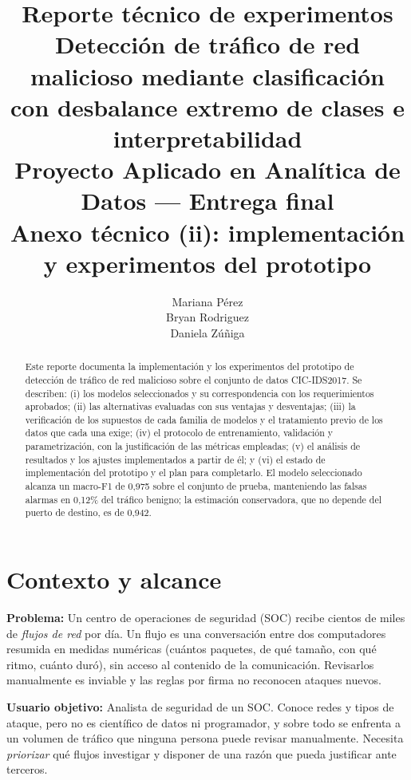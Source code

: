 \documentclass[11pt,a4paper]{article}
\title{\vspace{-1.2cm}\textbf{Reporte técnico de experimentos}\\[0.25cm]
\large Detección de tráfico de red malicioso mediante clasificación\\
\large con desbalance extremo de clases e interpretabilidad\\
\large \vspace{0.3cm} Proyecto Aplicado en Analítica de Datos --- Entrega final\\
\normalsize Anexo técnico (ii): implementación y experimentos del prototipo}
\author{Mariana Pérez\\Bryan Rodriguez\\Daniela Zúñiga}
\begin{document}
\maketitle
\thispagestyle{empty}

\begin{abstract}
\noindent
Este reporte documenta la implementación y los experimentos del prototipo de
detección de tráfico de red malicioso sobre el conjunto de datos CIC-IDS2017.
Se describen: (i) los modelos seleccionados y su correspondencia con los
requerimientos aprobados; (ii) las alternativas evaluadas con sus ventajas y
desventajas; (iii) la verificación de los supuestos de cada familia de
modelos y el tratamiento previo de los datos que cada una exige; (iv) el
protocolo de entrenamiento, validación y parametrización, con la
justificación de las métricas empleadas; (v) el análisis de resultados y los
ajustes implementados a partir de él; y (vi) el estado de implementación del
prototipo y el plan para completarlo. El modelo seleccionado alcanza un
macro-F1 de 0,975 sobre el conjunto de prueba, manteniendo las falsas alarmas
en 0,12\% del tráfico benigno; la estimación conservadora, que no depende del
puerto de destino, es de 0,942.
\end{abstract}

\vspace{0.3cm}

\section{Contexto y alcance}

\textbf{Problema:} Un centro de operaciones de seguridad (SOC) recibe cientos
de miles de \emph{flujos de red} por día. Un flujo es una conversación entre
dos computadores resumida en medidas numéricas (cuántos paquetes, de qué
tamaño, con qué ritmo, cuánto duró), sin acceso al contenido de la
comunicación. Revisarlos manualmente es inviable y las reglas por firma no
reconocen ataques nuevos.

\textbf{Usuario objetivo:} Analista de seguridad de un SOC. Conoce redes y
tipos de ataque, pero no es científico de datos ni programador, y sobre todo
se enfrenta a un volumen de tráfico que ninguna persona puede revisar
manualmente. Necesita \emph{priorizar} qué flujos investigar y disponer de una
razón que pueda justificar ante terceros.
\end{document}
